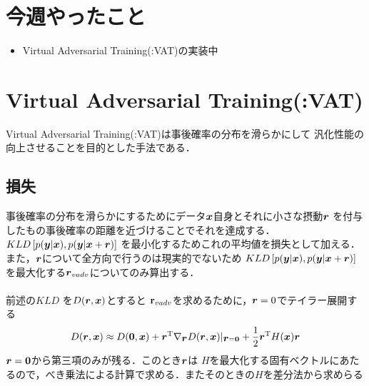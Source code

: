 \documentclass[twocolumn]{jarticle}     %
\begin{document}


\section{今週やったこと}
\begin{itemize}
 	\item Virtual Adversarial Training(:VAT)の実装中
\end{itemize}


\section{Virtual Adversarial Training(:VAT)}
Virtual Adversarial Training(:VAT)は事後確率の分布を滑らかにして
汎化性能の向上させることを目的とした手法である．\\

\subsection{損失}
事後確率の分布を滑らかにするためにデータ$\mbox{\boldmath $x$}$自身とそれに小さな摂動$\mbox{\boldmath $r$}$
を付与したもの事後確率の距離を近づけることでそれを達成する．
$KLD\left[ p(\mbox{\boldmath $y$}|\mbox{\boldmath $x$}),p(\mbox{\boldmath $y$}|\mbox{\boldmath $x$}+\mbox{\boldmath $r$})\right]$
を最小化するためこれの平均値を損失として加える．\\
また，$\mbox{\boldmath $r$}$について全方向で行うのは現実的でないため
$KLD\left[ p(\mbox{\boldmath $y$}|\mbox{\boldmath $x$}),p(\mbox{\boldmath $y$}|\mbox{\boldmath $x$}+\mbox{\boldmath $r$})\right]$
を最大化する$\mbox{\boldmath $r$}_{vadv}$についてのみ算出する．\\
\\
前述の$KLD$
を$D(\mbox{\boldmath $r$},\mbox{\boldmath $x$})$とすると
${\bf r}_{vadv}$を求めるために，$\mbox{\boldmath $r$}=0$でテイラー展開する
\begin{eqnarray}
	D(\mbox{\boldmath $r$},\mbox{\boldmath $x$})\approx
	D({\bf 0},\mbox{\boldmath $x$})+\mbox{\boldmath $r$}^{\rm T} 
	\nabla _{\mbox{\boldmath $r$}}	D(\mbox{\boldmath $r$},\mbox{\boldmath $x$})|_{\mbox{\boldmath $r$}={\bf 0}}
	+\frac{1}{2}\mbox{\boldmath $r$}^{\rm T}H(\mbox{\boldmath $x$})\mbox{\boldmath $r$}
\end{eqnarray}
$\mbox{\boldmath $r$}={\bf 0}$から第三項のみが残る．このとき$\mbox{\boldmath $r$}$は
$H$を最大化する固有ベクトルにあたるので，べき乗法による計算で求める．またそのときの$H$を差分法から求めらる
\end{document}
